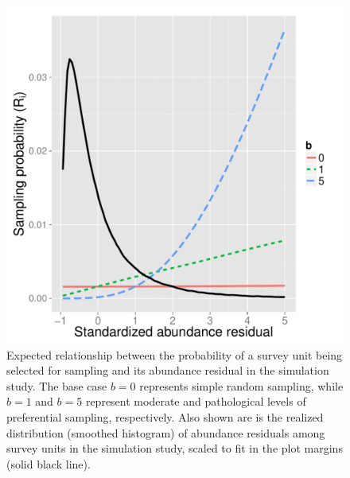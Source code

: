 \documentclass[times,mee,doublespace,]{besauth2}
\begin{document}
\begin{figure} %
\begin{center}
\includegraphics[width=170mm]{sim_R.pdf}
\caption{Expected relationship between the probability of a survey unit being selected for sampling and its abundance residual in the simulation study. The base case $b=0$ represents simple random sampling, while $b=1$ and $b=5$ represent moderate and pathological levels of preferential sampling, respectively.  Also shown are is the realized distribution (smoothed histogram) of abundance residuals among survey units in the simulation study, scaled to fit in the plot margins (solid black line).}
\label{fig:sim_R}
\end{center}
\end{figure}
\end{document}
